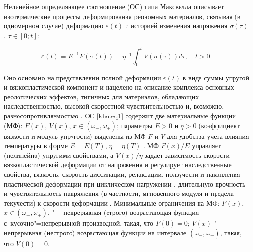 
Нелинейное определяющее соотношение (ОС) типа Максвелла описывает изотермические процессы деформирования реономных материалов, связывая (в одномерном случае) деформацию $\varepsilon(t)$ с историей изменения напряжения $\sigma(\tau)$, $\tau\in[0;t]$:

\begin{equation}

\label{kho:eq1}

\varepsilon(t)=E^{-1}F(\sigma(t))+\eta^{-1}\int_0^t{V(\sigma(\tau))d\tau},

\quad t>0.

\end{equation}

Оно основано на представлении полной деформации $\varepsilon(t)$ в виде суммы упругой и вязкопластической компонент и нацелено на описание комплекса основных реологических эффектов, типичных для материалов, обладающих наследственностью, высокой скоростной чувствительностью и, возможно, разносопротивляемостью \cite{kho:bib1,kho:bib2,kho:bib3,kho:bib4,kho:bib5,kho:bib6,kho:bib7,kho:bib8}. ОС \eqref{kho:eq1} содержит две материальные функции (МФ): $F(x)$, $V(x)$, $x\in(\omega_{-},\omega_{+})$; параметры $E>0$ и $\eta>0$ (коэффициент вязкости и модуль упругости) выделены из МФ $F$ и $V$ для удобства учета влияния температуры в форме $E=E(T)$, $\eta=\eta(T)$ \cite{kho:bib6,kho:bib7}. МФ $F(x)/E$ управляет (нелинейно) упругими свойствами, а $V(x)/\eta$ задает зависимость скорости вязкопластической деформации от напряжения и регулирует наследственные свойства, вязкость, скорость диссипации, релаксации, ползучести \cite{kho:bib1,kho:bib2,kho:bib4} и накопления пластической деформации при циклическом нагружении \cite{kho:bib7}, длительную прочность \cite{kho:bib3} и чувствительность напряжения (в частности, мгновенного модуля и предела текучести) к скорости деформации \cite{kho:bib5}. Минимальные ограничения на МФ: $F(x)$, $x\in(\omega_{-},\omega_{+})$, "--- непрерывная (строго) возрастающая функция с~кусочно"=непрерывной производной, такая, что $F(0)=0$; $V(x)$ "--- непрерывная (нестрого) возрастающая функция на интервале $(\omega_{-},\omega_{+})$, такая, что $V(0)=0$.



